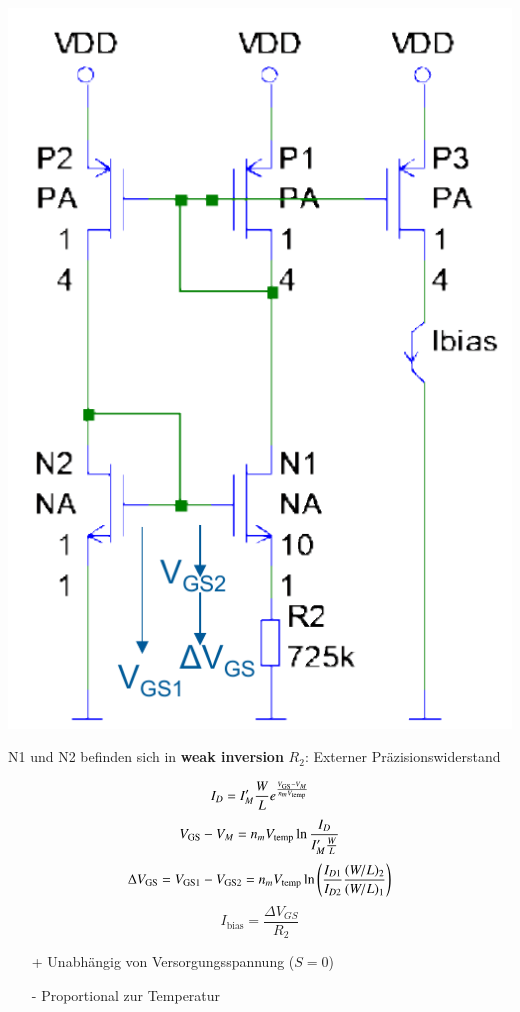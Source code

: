 \begin{minipage}[t]{0.38\columnwidth}
    \includegraphics[width=\columnwidth, align=t]{images/13_bootstrap_referenz.pdf}
\end{minipage}
\hfill
\begin{minipage}[t]{0.58\columnwidth}
    \begin{outline}
        \1 N1 und N2 befinden sich in \textbf{weak inversion}
        \1 $R_2$: Externer Präzisionswiderstand
    \end{outline}

    \smallskip

    \[
        I_D = I_M' \frac{W}{L} e^{\frac{V_{\rm GS}-V_M}{n_m V_\mathrm{temp}}}
    \]
    \[
        V_{\rm GS} - V_M = n_m V_\mathrm{temp} \ln{\frac{I_D}{I_M' \frac{W}{L}}}
    \]
    \[
        \Delta V_{\rm GS} = V_{\rm GS1} - V_{\rm GS2} = n_m V_\mathrm{temp} \ln\left(\frac{I_{D1}}{I_{D2}} \frac{(W/L)_2}{(W/L)_1}\right)
    \]
    \[
        I_\mathrm{bias} = \frac{\Delta V_{GS}}{R_2}
    \]

    \begin{itemize}
        \item[+] Unabhängig von Versorgungsspannung ($S=0$)
        \item[-] Proportional zur Temperatur 
    \end{itemize}
\end{minipage}


